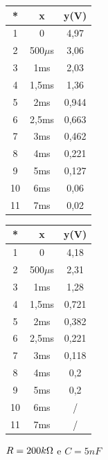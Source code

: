 \begin{figure}[ht]
\centering
\begin{minipage}{0.5\textwidth}
\centering
\vspace{0pt}
    \centering
    \begin{tabular}{c|c|c}
        * & x & y(V) \\
        \hline
        1 & 0 & 4,97 \\
        \hline
        2 & 500$\mu$s & 3,06 \\
        \hline
        3 & 1ms & 2,03\\
        \hline
        4 & 1,5ms & 1,36\\
        \hline
        5 & 2ms & 0,944\\
        \hline
        6 & 2,5ms & 0,663\\
        \hline
        7 & 3ms & 0,462\\
        \hline
        8 & 4ms & 0,221\\
        \hline
        9 & 5ms & 0,127\\
        \hline
        10 & 6ms & 0,06\\
        \hline
        11 & 7ms & 0,02\\
    \end{tabular}
    \caption{$R=10k\ohm$ e $100nF$}
    \label{tab:my_label}

\label{fig:my_label}
\end{minipage}%
\begin{minipage}{0.5\textwidth}
\centering
\vspace{0pt}
 \begin{tabular}{c|c|c}
        * & x & y(V) \\
        \hline
        1 & 0 & 4,18 \\
        \hline
        2 & 500$\mu$s & 2,31 \\
        \hline
        3 & 1ms & 1,28\\
        \hline
        4 & 1,5ms & 0,721\\
        \hline
        5 & 2ms & 0,382\\
        \hline
        6 & 2,5ms & 0,221\\
        \hline
        7 & 3ms & 0,118\\
        \hline
        8 & 4ms & 0,2\\
        \hline
        9 & 5ms & 0,2\\
        \hline
        10 & 6ms & /\\
        \hline
        11 & 7ms & /\\
 \end{tabular}
 \caption{$R=200k\ohm$ e $C=5nF$}
 \end{minipage}
\end{figure}

